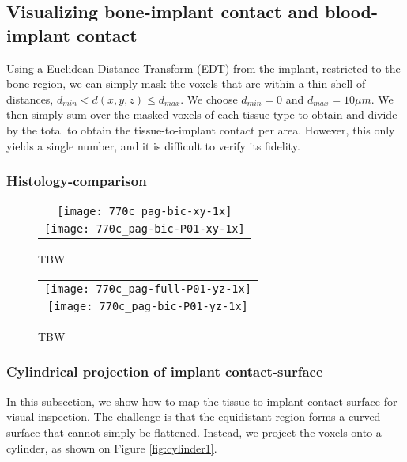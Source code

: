 \subsection{Visualizing bone-implant contact and blood-implant contact}

Using a Euclidean Distance Transform (EDT) from the implant, restricted to the
bone region, we can simply mask the voxels that are within a thin shell
of distances, $d_{min} < d(x,y,z) \le d_{max}$. We choose $d_{min} = 0$ and
$d_{max} = 10\mu m$.
We then simply sum over the masked voxels of each tissue type to obtain
and divide by the total to obtain the tissue-to-implant contact per area.
However, this only yields a single number, and it is difficult to verify
its fidelity.

\subsubsection{Histology-comparison}

\begin{figure}
  \centering
  \begin{tabular}{c}
    \texttt{[image: 770c\_pag-bic-xy-1x]} \\
    \texttt{[image: 770c\_pag-bic-P01-xy-1x]}
  \end{tabular}
  \caption{TBW}
  \label{fig:histology-comparison1}
\end{figure}

\begin{figure}
  \centering
  \begin{tabular}{c}
    \texttt{[image: 770c\_pag-full-P01-yz-1x]} \\
    \texttt{[image: 770c\_pag-bic-P01-yz-1x]}
  \end{tabular}
  \caption{TBW}
  \label{fig:histology-comparison2}
\end{figure}

\subsubsection{Cylindrical projection of implant contact-surface}

In this subsection, we show how to map the tissue-to-implant contact
surface for visual inspection. The challenge is that the equidistant
region forms a curved surface that cannot simply be flattened. Instead,
we project the voxels onto a cylinder, as shown on Figure \ref{fig:cylinder1}.

